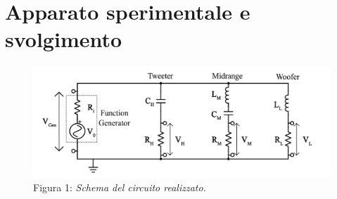 \documentclass[]{article}
\begin{document}
\section{Apparato sperimentale e svolgimento}
\begin{figure}[h]
	\centering
	\includegraphics[width=1\linewidth]{img/Schema}
	Figura 1: \emph{Schema del circuito realizzato.}
\end{figure}
\end{document}
